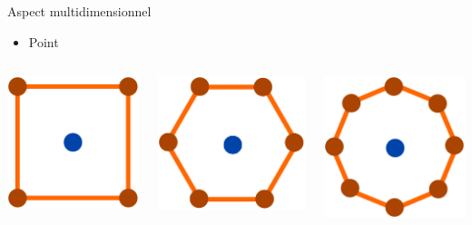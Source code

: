 \documentclass[xcolor=x11names,compress]{beamer}
\renewcommand{\(}{\begin{columns}} \renewcommand{\)}{\end{columns}}
\newcommand{\<}[1]{\begin{column}{#1}} \renewcommand{\>}{\end{column}}
\begin{document}
\begin{frame}{Aspect multidimensionnel}
  \begin{itemize}
    \item Point
  \end{itemize}
  \begin{columns}[t]
    \begin{column}{0.3\textwidth}
      \centering
      \includegraphics[scale=0.4]{OutilPoint4}
    \end{column}
    \begin{column}{0.3\textwidth}
      \centering
      \includegraphics[scale=0.4]{OutilPoint6}
    \end{column}
    \begin{column}{0.3\textwidth}
      \centering
      \includegraphics[scale=0.4]{OutilPoint8}

\end{column}
\end{columns}
\end{frame}
\end{document}
